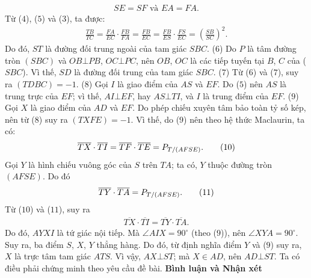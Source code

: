 \begin{multicols}{2}
	\begin{align*}
		SE = SF \text{ và } EA = FA.  \tag{$5$}
	\end{align*} 
	Từ ($4$), ($5$) và ($3$), ta được:
	\begin{align*}
		\frac{{TB}}{{TC}} \!=\! \frac{{FA}}{{EC}} \!\cdot\! \frac{{FB}}{{FA}} \!=\! \frac{{FB}}{{EC}} \!=\! \frac{{FB}}{{ES}} \!\cdot\! \frac{{FS}}{{EC}} \!=\! {\left( {\frac{{SB}}{{SC}}} \right)^2}.
	\end{align*}
	Do đó, $ST$ là đường đối trung ngoài của tam giác $SBC$. \hfill ($6$)
	\vskip 0.05cm
	Do $P$ là tâm đường tròn $(SBC)$ và $OB \bot PB$, $OC \bot PC$, nên $OB$, $OC$ là các tiếp tuyến tại $B$, $C$ của ($SBC$). Vì thế, $SD$ là đường đối trung của tam giác $SBC$. \hfill ($7$)
	\vskip 0.05cm
	Từ ($6$) và ($7$), suy ra  $\left( {TDBC} \right) =  - 1.$           \hfill ($8$)
	\vskip 0.05cm
	Gọi $I$ là giao điểm của $AS$ và $EF$. Do ($5$) nên $AS$ là trung trực của $EF$; vì thế,  $AI \bot EF$, hay $AS \bot TI$, và $I$ là trung điểm của $EF$. \hfill ($9$)
	\vskip 0.05cm
	Gọi $X$ là giao điểm của $AD$ và $EF$.
	\vskip 0.05cm
	Do phép chiếu xuyên tâm bảo toàn tỷ số kép, nên từ ($8$) suy ra $\left( {TXFE} \right) =  - 1$.  Vì thế, do ($9$) nên theo hệ thức Maclaurin, ta có:
	\begin{align*}
		\overline {TX}  \cdot \overline {TI}  = \overline {TF}  \cdot \overline {TE}  = {P_{{T \mathord{\left/
						{\vphantom {T {\left( {AFSE} \right)}}} \right.
						\kern-\nulldelimiterspace} {\left( {AFSE} \right)}}}}.\tag{$10$}
	\end{align*}
	Gọi $Y$ là hình chiếu vuông góc của $S$ trên $TA$; ta có, $Y$ thuộc đường tròn $(AFSE)$. Do đó
	\begin{align*}
		\overline {TY}  \cdot \overline {TA}  = {P_{{T \mathord{\left/
						{\vphantom {T {\left( {AFSE} \right)}}} \right.
						\kern-\nulldelimiterspace} {\left( {AFSE} \right)}}}}. \tag{$11$}
	\end{align*}
	Từ ($10$) và ($11$), suy ra
	\begin{align*}
		\overline {TX}  \cdot \overline {TI}  = \overline {TY}  \cdot \overline {TA} .
	\end{align*}
	Do đó, $AYXI$ là tứ giác nội tiếp. Mà $\angle AIX = {90^{\circ}}$  (theo ($9$)), nên $\angle XYA = {90^{\circ}}$.  Suy ra, ba điểm $S$, $X$, $Y$ thẳng hàng. Do đó, từ định nghĩa điểm $Y$ và ($9$) suy ra, $X$ là trực tâm tam giác $ATS$. Vì vậy, $AX \bot ST$; mà $X \in AD$, nên $AD \bot ST$.
	\vskip 0.05cm
	Ta có điều phải chứng minh theo yêu cầu đề bài.
	\vskip 0.05cm
	\textbf{\color{thachthuctoanhoc}Bình luận và Nhận xét}

\end{multicols}
